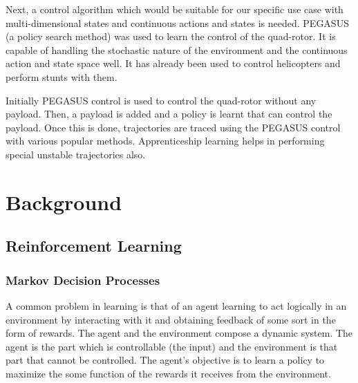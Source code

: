 \documentclass[hidelinks,BTech]{iitmdiss}
\begin{document}
Next, a control algorithm which would be suitable for our specific use case with multi-dimensional states and continuous actions and states is needed. PEGASUS (a policy search method) was used to learn the control of the quad-rotor. It is capable of handling the stochastic nature of the environment and the continuous action and state space well. It has already been used to control helicopters and perform stunts with them.

Initially PEGASUS control is used to control the quad-rotor without any payload. Then, a payload is added and a policy is learnt that can control the payload. Once this is done, trajectories are traced using the PEGASUS control with various popular methods. Apprenticeship learning helps in performing special unstable trajectories also.

\chapter{Background}

\section{Reinforcement Learning}

\subsection{Markov Decision Processes}
A common problem in learning is that of an agent learning to act logically in an environment by interacting with it and obtaining feedback of some sort in the form of rewards. The agent and the environment compose a dynamic system. The agent is the part which is controllable (the input) and the environment is that part that cannot be controlled. The agent's objective is to learn a policy to maximize the some function of the rewards it receives from the environment.
\end{document}
